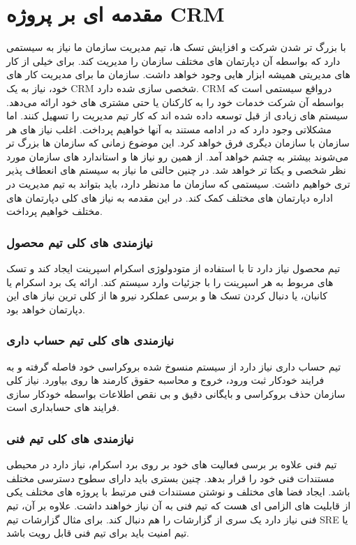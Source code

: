 \section{مقدمه ای بر پروژه CRM}
با بزرگ تر شدن شرکت و افزایش تسک ها، تیم مدیریت سازمان ما نیاز به سیستمی دارد که بواسطه آن دپارتمان های مختلف سازمان را مدیریت کند.
برای خیلی از کار های مدیریتی همیشه ابزار هایی وجود خواهد داشت. سازمان ما برای مدیریت کار های خود، نیاز به یک CRM شخصی سازی شده دارد.
CRM درواقع سیستمی است که بواسطه آن شرکت خدمات خود را به کارکنان یا حتی مشتری های خود ارائه می‌دهد.
سیستم های زیادی از قبل توسعه داده شده اند که کار تیم مدیریت را تسهیل کنند. اما مشکلاتی وجود دارد که در ادامه مستند به آنها خواهیم پرداخت.
اغلب نیاز های هر سازمان با سازمان دیگری فرق خواهد کرد. این موضوع زمانی که سازمان ها بزرگ تر می‌شوند بیشتر به چشم خواهد آمد.
از همین رو نیاز ها و استاندارد های سازمان مورد نظر شخصی و یکتا تر خواهد شد. در چنین حالتی ما نیاز به سیستم های انعطاف پذیر تری خواهیم داشت.
سیستمی که سازمان ما مدنظر دارد، باید بتواند به تیم مدیریت در اداره دپارتمان های مختلف کمک کند. در این مقدمه به نیاز های کلی دپارتمان های مختلف خواهیم پرداخت.

\subsubsection{نیازمندی های کلی تیم محصول}
تیم محصول نیاز دارد تا با استفاده از متودولوژی اسکرام اسپرینت ایجاد کند و تسک های مربوط به هر اسپرینت را با جزئیات وارد سیستم کند.
ارائه یک برد اسکرام یا کانبان، یا دنبال کردن تسک ها و برسی عملکرد نیرو ها از کلی ترین نیاز های این دپارتمان خواهد بود.

\subsubsection{نیازمندی های کلی تیم حساب داری}
تیم حساب داری نیاز دارد از سیستم منسوخ شده بروکراسی خود فاصله گرفته و به فرایند خودکار ثبت ورود، خروج و محاسبه حقوق کارمند ها روی بیاورد.
نیاز کلی سازمان حذف بروکراسی و بایگانی دقیق و بی نقص اطلاعات بواسطه خودکار سازی فرایند های حسابداری است.

\subsubsection{نیازمندی های کلی تیم فنی}
تیم فنی علاوه بر برسی فعالیت های خود بر روی برد اسکرام، نیاز دارد در محیطی مستندات فنی خود را قرار بدهد. چنین بستری باید دارای سطوح دسترسی مختلف باشد.
ایجاد فضا های مختلف و نوشتن مستندات فنی مرتبط با پروژه های مختلف یکی از قابلیت های الزامی ای هست که تیم فنی به آن نیاز خواهند داشت.
علاوه بر آن، تیم فنی نیاز دارد یک سری از گزارشات را هم دنبال کند. برای مثال گزارشات تیم SRE یا تیم امنیت باید برای تیم فنی قابل رویت باشد.

